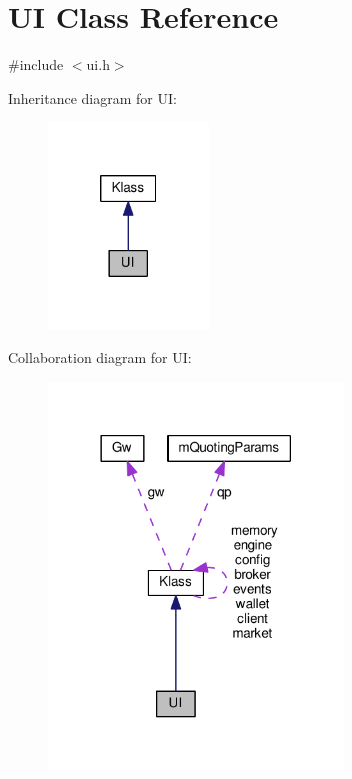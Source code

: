 \hypertarget{class_k_1_1_u_i}{}\section{UI Class Reference}
\label{class_k_1_1_u_i}


{\ttfamily \#include $<$ui.\+h$>$}



Inheritance diagram for UI\+:
\nopagebreak
\begin{figure}[H]
\begin{center}
\leavevmode
\includegraphics[width=121pt]{class_k_1_1_u_i__inherit__graph}
\end{center}
\end{figure}


Collaboration diagram for UI\+:
\nopagebreak
\begin{figure}[H]
\begin{center}
\leavevmode
\includegraphics[width=222pt]{class_k_1_1_u_i__coll__graph}
\end{center}
\end{figure}
